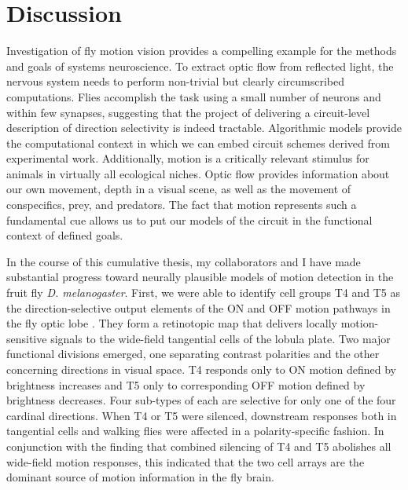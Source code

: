 \chapter{Discussion}
\label{chp:discussion}

Investigation of fly motion vision provides a compelling example for the methods and goals of systems neuroscience. To extract optic flow from reflected light, the nervous system needs to perform non-trivial but clearly circumscribed computations. Flies accomplish the task using a small number of neurons and within few synapses, suggesting that the project of delivering a circuit-level description of direction selectivity is indeed tractable. Algorithmic models provide the computational context in which we can embed circuit schemes derived from experimental work. Additionally, motion is a critically relevant stimulus for animals in virtually all ecological niches. Optic flow provides information about our own movement, depth in a visual scene, as well as the movement of conspecifics, prey, and predators. The fact that motion represents such a fundamental cue allows us to put our models of the circuit in the functional context of defined goals.

In the course of this cumulative thesis, my collaborators and I have made substantial progress toward neurally plausible models of motion detection in the fruit fly \textit{D. melanogaster}. First, we were able to identify cell groups T4 and T5 as the direction-selective output elements of the ON and OFF motion pathways in the fly optic lobe \citep{Maisak:2013kk}. They form a retinotopic map that delivers locally motion-sensitive signals to the wide-field tangential cells of the lobula plate. Two major functional divisions emerged, one separating contrast polarities and the other concerning directions in visual space. T4 responds only to ON motion defined by brightness increases and T5 only to corresponding OFF motion defined by brightness decreases. Four sub-types of each are selective for only one of the four cardinal directions. When T4 or T5 were silenced, downstream responses both in tangential cells and walking flies were affected in a polarity-specific fashion. In conjunction with the finding that combined silencing of T4 and T5 abolishes all wide-field motion responses, this indicated that the two cell arrays are the dominant source of motion information in the fly brain.

